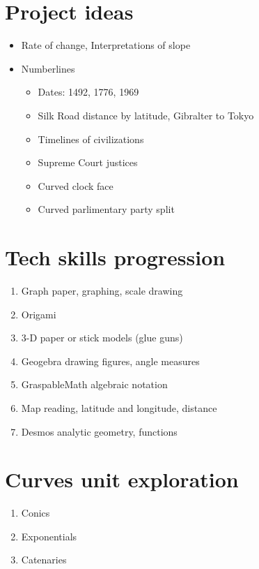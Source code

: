 \section*{Project ideas}
\begin{itemize}
  \item Rate of change, Interpretations of slope
  \item Numberlines
  \begin{itemize}
    \item Dates: 1492, 1776, 1969
    \item Silk Road distance by latitude, Gibralter to Tokyo
    \item Timelines of civilizations
    \item Supreme Court justices
    \item Curved clock face 
    \item Curved parlimentary party split
  \end{itemize}
\end{itemize}

\section*{Tech skills progression}
\begin{enumerate}
  \item Graph paper, graphing, scale drawing
  \item Origami
  \item 3-D paper or stick models (glue guns)
  \item Geogebra drawing figures, angle measures
  \item GraspableMath algebraic notation
  \item Map reading, latitude and longitude, distance
  \item Desmos analytic geometry, functions
\end{enumerate}

\section*{Curves unit exploration}
\begin{enumerate}
  \item Conics
  \item Exponentials
  \item Catenaries
\end{enumerate}


